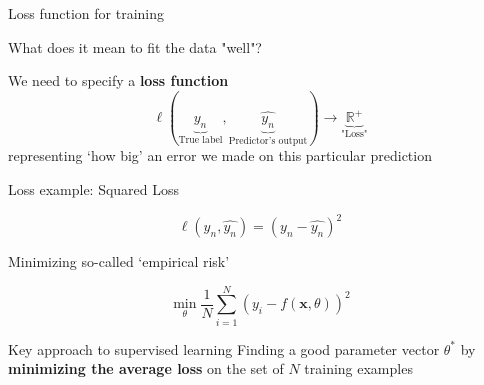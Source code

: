 \documentclass[12pt,aspectratio=169,handout]{beamer}
\begin{document}
%
%
%
%
%

\begin{frame}{Loss function for training}

What does it mean to fit the data "well"?

We need to specify a \textbf{loss function}
$$
\ell(\underbrace{y_n}_{\text{True label}}, \underbrace{\hat{y_n}}_{\text{Predictor's output}}) \to \underbrace{\mathbb{R}^{+}}_{\text{"Loss"}}
$$
representing `how big' an error we made on this particular prediction




\end{frame}


\begin{frame}{Loss example: Squared Loss}

$$
\ell(y_n, \hat{y_n}) = (y_n - \hat{y_n})^2
$$

Minimizing so-called `empirical risk'

$$
\min_{\theta} \frac{1}{N} \sum_{i = 1}^{N} (y_i - f(\mathbf{x}, \theta))^2
$$

\begin{block}{Key approach to supervised learning}
Finding a good parameter vector $\theta^*$ by \textbf{minimizing the average loss} on the set of $N$ training examples
\end{block}

\end{frame}

%	
%
%
%
%
%
%
\end{document}

